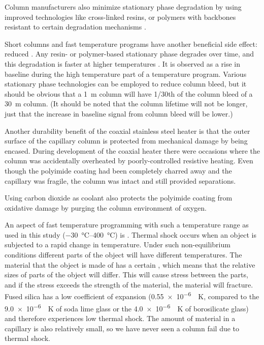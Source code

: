 Column manufacturers also minimize sta\-tion\-ary phase degradation by using
improved technologies like cross-linked resins, or polymers with backbones
resistant to certain degradation mechanisms \autocite{Day2003}.

Short columns and fast temperature programs have another beneficial side effect:
reduced . Any resin- or polymer-based stationary phase
degrades over time, and this degradation is faster at higher temperatures
\autocite[p. 66]{Mcnair2019}. It is observed as a rise in baseline during the
high temperature part of a temperature program. Various stationary phase
technologies can be employed to reduce column bleed, but it should be obvious
that a \SI{1}{\metre} column will have \num{1/30}th of the
column bleed of a \SI{30}{\metre} column. (It should be noted that the column
lifetime will not be longer, just that the increase in baseline signal from
column bleed will be lower.)

Another durability benefit of the coaxial stainless steel heater is that the
outer surface of the capillary column is protected from mechanical damage by
being encased. During development of the coaxial heater there were occasions
where the column was accidentally overheated by poorly-controlled resistive
heating. Even though the polyimide coating had been completely charred away and
the capillary was fragile, the column was intact and still provided separations.

Using carbon dioxide as coolant also protects the polyimide coating from
oxidative damage by purging the column environment of oxygen.

An aspect of fast temperature programming with such a temperature range as used
in this study (\SIrange{-30}{400}{\celsius}) is . Thermal
shock occurs when an object is subjected to a rapid change in temperature. Under
such non-equilibrium conditions different parts of the object will have
different temperatures. The material that the object is made of has a certain
, which means that the relative sizes
of parts of the object will differ. This will cause stress between the parts,
and if the stress exceeds the strength of the material, the material will
fracture. Fused silica has a low coefficient of expansion
(\SI{0.55e-6}{\per\kelvin}, compared to the \SI{9.0e-6}{\per\kelvin} of soda
lime glass or the \SI{4.0e-6}{\per\kelvin} of borosilicate glass) and
therefore experiences low thermal shock. The amount of material in a capillary is
also relatively small, so we have never seen a column fail due to thermal shock.

